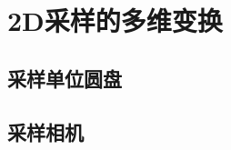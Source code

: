 \section{2D采样的多维变换}\label{sec:2D采样的多维变换}

\subsection{采样单位圆盘}\label{sub:采样单位圆盘}

\subsection{采样相机}\label{sub:采样相机1}
